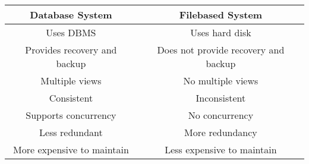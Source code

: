 \documentclass{article}
\begin{document}
    \begin{center}
        \begin{tabular}{||c | c||}
            \hline
                Database System & Filebased System \\ [0.5ex]
            \hline\hline
                Uses DBMS & Uses hard disk \\
            \hline
                Provides recovery and backup & Does not provide recovery and backup \\
            \hline
                Multiple views & No multiple views \\
            \hline
                Consistent & Inconsistent \\
            \hline
                Supports concurrency & No concurrency \\
            \hline
                Less redundant & More redundancy \\
            \hline
                More expensive to maintain & Less expensive to maintain \\
            \hline
        \end{tabular}
    \end{center}
\end{document}
